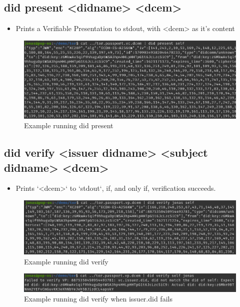\newpage

\subsection{did present <didname> <dcem>}
\begin{itemize}
    \item Prints a Verifiable Presentation to stdout, with <dcem> as it's content 
\end{itemize}
    \begin{figure}[htbp]
      \centering
      \includegraphics[width=.7\textwidth]{figures/cmd-present.png}
      \caption[]{Example running did present}
    \end{figure}


\subsection{did verify <issuer didname> <subject didname> <dcem>}
\begin{itemize}
\item Prints `<dcem>` to `stdout`, if, and only if, verification succeeds.
\end{itemize}
    \begin{figure}[htbp]
      \centering
      \includegraphics[width=.7\textwidth]{figures/cmd-verify.png}
      \caption[]{Example running did verify}
    \end{figure}
    \begin{figure}[htbp]
      \centering
      \includegraphics[width=.7\textwidth]{figures/cmd-verify-issuerfails.png}
      \caption[]{Example running did verify when issuer.did fails}
    \end{figure}


